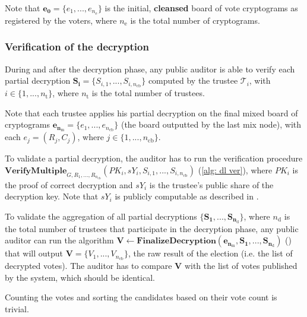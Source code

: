 Note that $\boldsymbol{e_0} = \{ e_1, ..., e_{n_\mathrm{e}} \}$ is the initial, \textbf{cleansed} board of vote cryptograms as registered by the voters, where $n_\mathrm{e}$ is the total number of cryptograms. 


\subsubsection{Verification of the decryption}
During and after the decryption phase, any public auditor is able to verify each partial decryption \( \boldsymbol{S_i} = \{ S_{i,1}, ..., S_{i,n_\mathrm{cb}} \} \) computed by the trustee $\mathcal{T}_i$, with \( i \in \{ 1, ..., n_\mathrm{t} \} \), where $n_\mathrm{t}$ is the total number of trustees. 

Note that each trustee applies his partial decryption on the final mixed board of cryptograms \( \boldsymbol{e_{n_\mathrm{m}}} = \{ e_1, ..., e_{n_\mathrm{cb}} \} \) (the board outputted by the last mix node), with each \( e_j = (R_j, C_j) \), where \( j \in \{ 1, ..., n_\mathrm{cb} \} \).

To validate a partial decryption, the auditor has to run the verification procedure \( \mathbf{VerifyMultiple}_{G, R_1, ..., R_{n_\mathrm{cb}}} (PK_i, sY_i, S_{i,1}, ..., S_{i,n_\mathrm{cb}}) \) (\cref{alg: dl ver}), where $PK_i$ is the proof of correct decryption and $sY_i$ is the trustee's public share of the decryption key. Note that $sY_i$ is publicly computable as described in .

To validate the aggregation of all partial decryptions \( \{\boldsymbol{S_1}, ..., \boldsymbol{S_{n_\mathrm{d}}}\} \), where $n_\mathrm{d}$ is the total number of trustees that participate in the decryption phase, any public auditor can run the algorithm \( \boldsymbol{V} \leftarrow \mathbf{FinalizeDecryption} (\boldsymbol{e_{n_\mathrm{m}}}, \boldsymbol{S_1}, ..., \boldsymbol{S_{n_\mathrm{d}}}) \) () that will output \( \boldsymbol{V} = \{ V_1, ..., V_{n_\mathrm{cb}} \} \), the raw result of the election (i.e. the list of decrypted votes). The auditor has to compare $\boldsymbol{V}$ with the list of votes published by the system, which should be identical.

Counting the votes and sorting the candidates based on their vote count is trivial.

